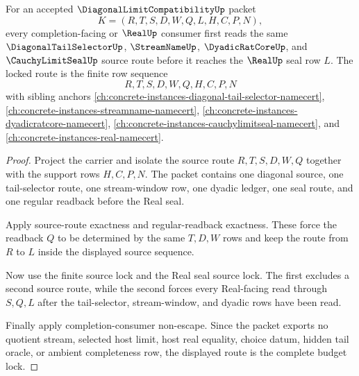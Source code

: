 \begin{theorem}
\label{thm:diagonal-limit-compatibility-source-route-budget-lock}
For an accepted $\DiagonalLimitCompatibilityUp$ packet
$$
K=(R,T,S,D,W,Q,L,H,C,P,N),
$$
every completion-facing or $\RealUp$ consumer first reads the same $\DiagonalTailSelectorUp$, $\StreamNameUp$, $\DyadicRatCoreUp$, and $\CauchyLimitSealUp$ source route before it reaches the $\RealUp$ seal row $L$. The locked route is the finite row sequence
$$
R,T,S,D,W,Q,H,C,P,N
$$
with sibling anchors \autoref{ch:concrete-instances-diagonal-tail-selector-namecert}, \autoref{ch:concrete-instances-streamname-namecert}, \autoref{ch:concrete-instances-dyadicratcore-namecert}, \autoref{ch:concrete-instances-cauchylimitseal-namecert}, and \autoref{ch:concrete-instances-real-namecert}.
\end{theorem}
\begin{proof}
Project the carrier and isolate the source route $R,T,S,D,W,Q$ together with the support rows $H,C,P,N$. The packet contains one diagonal source, one tail-selector route, one stream-window row, one dyadic ledger, one seal route, and one regular readback before the Real seal.

Apply source-route exactness and regular-readback exactness. These force the readback $Q$ to be determined by the same $T,D,W$ rows and keep the route from $R$ to $L$ inside the displayed source sequence.

Now use the finite source lock and the Real seal source lock. The first excludes a second source route, while the second forces every Real-facing read through $S,Q,L$ after the tail-selector, stream-window, and dyadic rows have been read.

Finally apply completion-consumer non-escape. Since the packet exports no quotient stream, selected host limit, host real equality, choice datum, hidden tail oracle, or ambient completeness row, the displayed route is the complete budget lock.
\end{proof}

